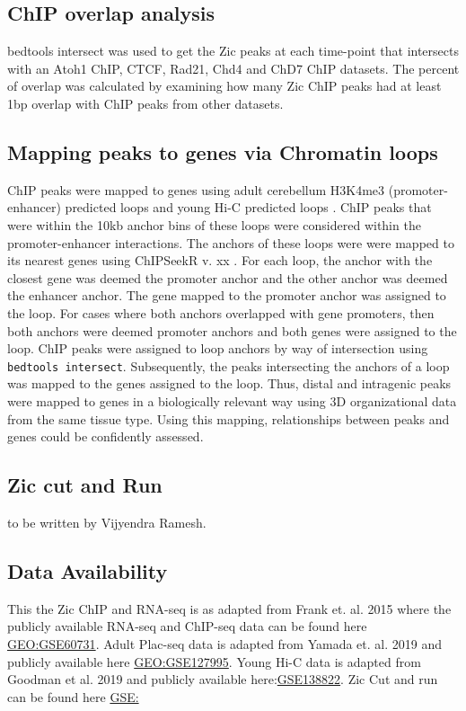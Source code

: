 \documentclass[fleqn,10pt,twocolumn]{wlscirep}
\begin{document}
\subsection*{ChIP overlap analysis}
bedtools intersect was used to get the Zic peaks at each time-point that intersects with an Atoh1 ChIP, CTCF, Rad21, Chd4 and ChD7 ChIP datasets. The percent of overlap was calculated by examining how many Zic ChIP peaks had at least 1bp overlap with ChIP peaks from other datasets. 


\subsection*{Mapping peaks to genes via Chromatin loops}
ChIP peaks were mapped to genes using adult cerebellum H3K4me3 (promoter-enhancer) predicted loops \cite{Yamada2019SensoryLearning} and young Hi-C predicted loops \cite{Goodman2019RegulationRemodeling}. ChIP peaks that were within the 10kb anchor bins of these loops were considered within the promoter-enhancer interactions. The anchors of these loops were were mapped to its nearest genes using ChIPSeekR v. xx \cite{}. For each loop, the anchor with the closest gene was deemed the promoter anchor and the other anchor was deemed the enhancer anchor. The gene mapped to the promoter anchor was assigned to the loop. For cases where both anchors overlapped with gene promoters, then both anchors were deemed promoter anchors and both genes were assigned to the loop. ChIP peaks were assigned to loop anchors by way of intersection using \texttt{bedtools intersect}. Subsequently, the peaks intersecting the anchors of a loop was mapped to the genes assigned to the loop. Thus, distal and intragenic peaks were mapped to genes in a biologically relevant way using 3D organizational data from the same tissue type. Using this mapping, relationships between peaks and genes could be confidently assessed.  

\subsection*{Zic cut and Run}
to be written by Vijyendra  Ramesh.

\subsection*{Data Availability}
This the Zic ChIP and RNA-seq is as adapted from Frank et. al. 2015 \cite{Frank2015RegulationCerebellum} where the publicly available RNA-seq and ChIP-seq  data can be found here \href{https://www.ncbi.nlm.nih.gov/geo/query/acc.cgi?acc=GSE60731}{GEO:GSE60731}. Adult Plac-seq data is adapted from Yamada et. al. 2019 \cite{Yamada2019SensoryLearning} and publicly available here \href{https://www.ncbi.nlm.nih.gov/geo/query/acc.cgi?acc=GSE127995}{GEO:GSE127995}. Young Hi-C data is adapted from Goodman et al. 2019 \cite{Goodman2020TheBrain} and publicly available here:\href{https://www.ncbi.nlm.nih.gov/geo/query/acc.cgi?acc=GSE138822}{GSE138822}. Zic Cut and run can be found here \href{}{GSE:}
\end{document}
